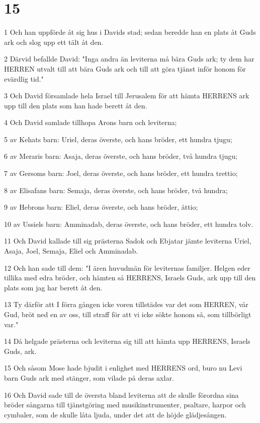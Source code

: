 \chapter{15}

\par 1 Och han uppförde åt sig hus i Davids stad; sedan beredde han en plats åt Guds ark och slog upp ett tält åt den.
\par 2 Därvid befallde David: "Inga andra än leviterna må bära Guds ark; ty dem har HERREN utvalt till att bära Guds ark och till att göra tjänst inför honom för evärdlig tid."
\par 3 Och David församlade hela Israel till Jerusalem för att hämta HERRENS ark upp till den plats som han hade berett åt den.
\par 4 Och David samlade tillhopa Arons barn och leviterna;
\par 5 av Kehats barn: Uriel, deras överste, och hans bröder, ett hundra tjugu;
\par 6 av Meraris barn: Asaja, deras överste, och hans bröder, två hundra tjugu;
\par 7 av Gersoms barn: Joel, deras överste, och hans bröder, ett hundra trettio;
\par 8 av Elisafans barn: Semaja, deras överste, och hans bröder, två hundra;
\par 9 av Hebrons barn: Eliel, deras överste, och hans bröder, åttio;
\par 10 av Ussiels barn: Amminadab, deras överste, och hans bröder, ett hundra tolv.
\par 11 Och David kallade till sig prästerna Sadok och Ebjatar jämte leviterna Uriel, Asaja, Joel, Semaja, Eliel och Amminadab.
\par 12 Och han sade till dem: "I ären huvudmän för leviternas familjer. Helgen eder tillika med edra bröder, och hämten så HERRENS, Israels Guds, ark upp till den plats som jag har berett åt den.
\par 13 Ty därför att I förra gången icke voren tillstädes var det som HERREN, vår Gud, bröt ned en av oss, till straff för att vi icke sökte honom så, som tillbörligt var."
\par 14 Då helgade prästerna och leviterna sig till att hämta upp HERRENS, Israels Guds, ark.
\par 15 Och såsom Mose hade bjudit i enlighet med HERRENS ord, buro nu Levi barn Guds ark med stänger, som vilade på deras axlar.
\par 16 Och David sade till de översta bland leviterna att de skulle förordna sina bröder sångarna till tjänstgöring med musikinstrumenter, psaltare, harpor och cymbaler, som de skulle låta ljuda, under det att de höjde glädjesången.
